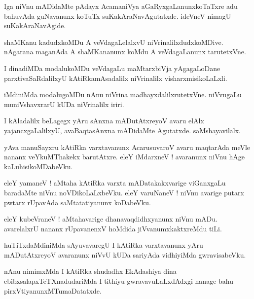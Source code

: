 \documentclass{article}
\begin{document}
\begin{mn}%
Iga niVnu mADidaMte pAdayx AcamaniVya aGaRyxgaLanunxkoTaTxre adu bahuvAda guNavanunx koTuTx 
suKakAraNavAgutatxde. ideVneV nimagU suKakAraNavAgide.
\end{mn}

\begin{mn}%
shaMKanu kadudxkoMDu A veVdagaLelalxvU niVrinalilxdudxkoMDive. nAgarana maganAda A shaMKananunx 
koMdu A veVdagaLanunx tarutetxVne.
\end{mn}

\begin{mn}%
I dinadiMDa modalukoMDu veVdagaLu maMtarxbiVja yAgagaLoDane parxtivaSaRdalilxyU kAtiRkamAsadalilx 
niVrinalilx visharxmisikoLaLxli.
\end{mn}

\begin{mn}%
iMdiniMda modalugoMDu nAnu niVrina madhayxdalilxrutetxVne. niVvugaLu muniVshavxrarU kUDa 
niVrinalilx iriri.
\end{mn}

\begin{mn}%
I kAladalilx beLagegx yAru sAnxna mADutAtxreyoV avaru elAlx yajancxgaLalilxyU, avaBaqtasAnxna 
mADidaMte Agutatxde. saMshayavilalx.
\end{mn}

\begin{mn}%
yAva manuSayxru kAtiRka varxtavanunx AcarusuvaroV avaru maqtarAda meVle nananx veYkuMThakekx 
barutAtxre. eleY iMdarxneV ! avaranunx niVnu hAge kaLuhisikoMDabeVku.
\end{mn}

\begin{mn}%
eleY yamaneV ! aMtaha kAtiRka varxta mADatakakxvarige viGanxgaLu baradaMte niVnu noVDikoLaLxbeVku. 
eleY varuNaneV ! niVnu avarige putarx pwtarx rUpavAda saMtatatiyanunx koDabeVku.
\end{mn}

\begin{mn}%
eleY kubeVraneV ! aMtahavarige dhanavaqdidhxyanunx niVnu mADu. avarelalxrU nananx rUpavanenxV 
hoMdida jiVvanumxkaktxreMdu tiLi.
\end{mn}

\begin{mn}%
huTiTxdaMdiniMda sAyuvavaregU I kAtiRka varxtavanunx yAru mADutAtxreyoV avaranunx niVvU kUDa 
sariyAda vidhiyiMda gwravisabeVku.
\end{mn}

\begin{mn}%
nAnu nimimxMda I kAtiRka shudadhx EkAdashiya dina ebibxsalapxTeTXnadudariMda I tithiyu 
gwravavuLaLxdAdxgi nanage bahu pirxVtiyanunxMTumaDatatxde.
\end{mn}
\end{document}
